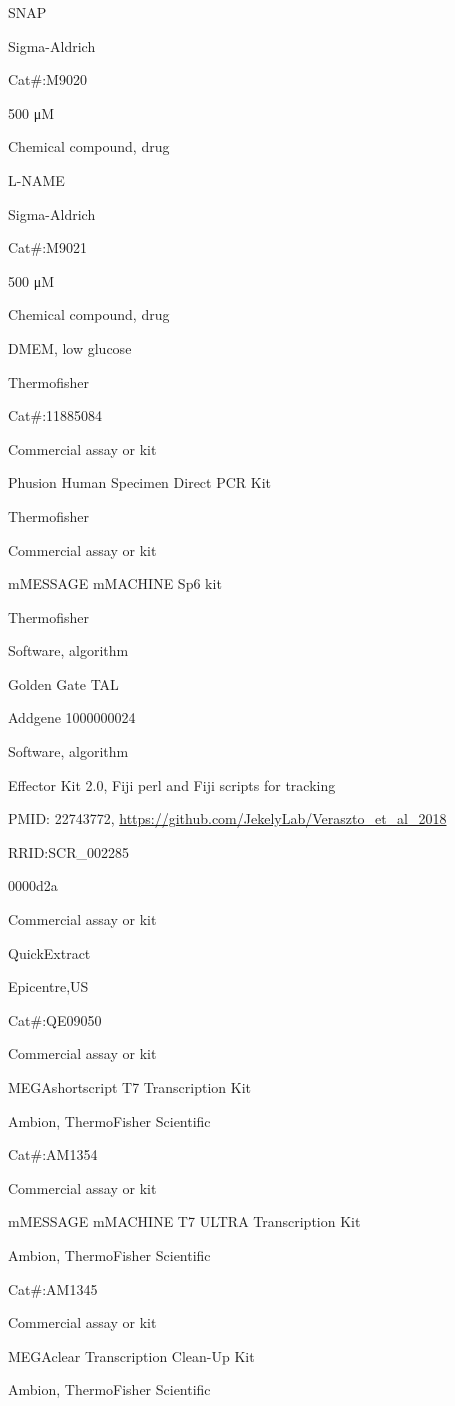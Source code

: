 \documentclass[
  10pt,
  onecolumn]{article}
\begin{document}
SNAP

Sigma-Aldrich

Cat\#:M9020

500 μM

Chemical compound, drug

L-NAME

Sigma-Aldrich

Cat\#:M9021

500 μM

Chemical compound, drug

DMEM, low glucose

Thermofisher

Cat\#:11885084

Commercial assay or kit

Phusion Human Specimen Direct PCR Kit

Thermofisher

Commercial assay or kit

mMESSAGE mMACHINE Sp6 kit

Thermofisher

Software, algorithm

Golden Gate TAL

Addgene 1000000024

Software, algorithm

Effector Kit 2.0, Fiji perl and Fiji scripts for tracking

PMID: 22743772, \url{https://github.com/JekelyLab/Veraszto_et_al_2018}

RRID:SCR\_002285

0000d2a

Commercial assay or kit

QuickExtract

Epicentre,US

Cat\#:QE09050

Commercial assay or kit

MEGAshortscript T7 Transcription Kit

Ambion, ThermoFisher Scientific

Cat\#:AM1354

Commercial assay or kit

mMESSAGE mMACHINE T7 ULTRA Transcription Kit

Ambion, ThermoFisher Scientific

Cat\#:AM1345

Commercial assay or kit

MEGAclear Transcription Clean-Up Kit

Ambion, ThermoFisher Scientific
\end{document}
